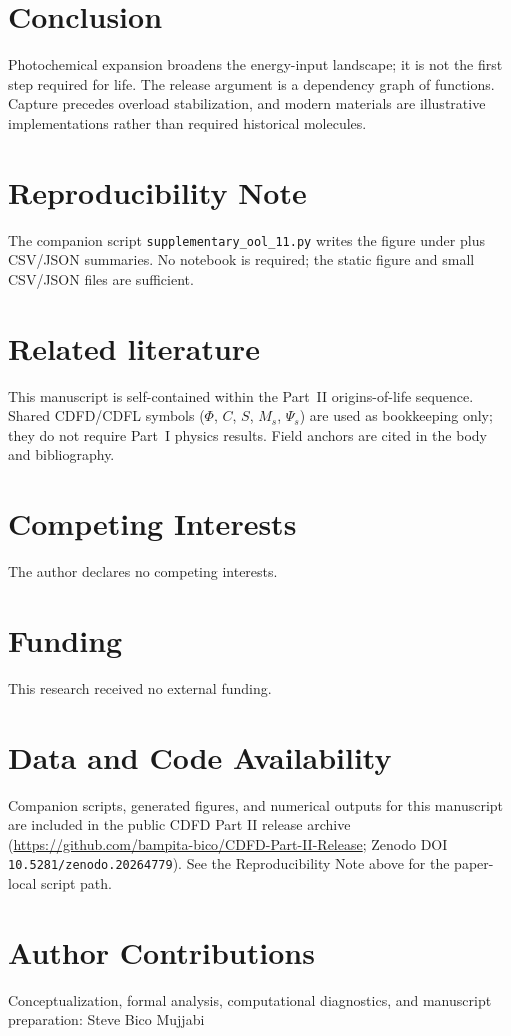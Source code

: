\documentclass[11pt,a4paper]{article}
\begin{document}
\section{Conclusion}
Photochemical expansion broadens the energy-input landscape; it is not the first step required for life. The release argument is a dependency graph of functions. Capture precedes overload stabilization, and modern materials are illustrative implementations rather than required historical molecules.

\section{Reproducibility Note}
The companion script \texttt{supplementary\_ool\_11.py} writes the figure
under  plus CSV/JSON summaries. No notebook is
required; the static figure and small CSV/JSON files are sufficient.

\section*{Related literature}
This manuscript is self-contained within the Part~II origins-of-life sequence. Shared CDFD/CDFL symbols ($\Phi$, $C$, $S$, $M_s$, $\Psi_s$) are used as bookkeeping only; they do not require Part~I physics results. Field anchors are cited in the body and bibliography.

\section*{Competing Interests}
The author declares no competing interests.

\section*{Funding}
This research received no external funding.

\section*{Data and Code Availability}
Companion scripts, generated figures, and numerical outputs for this manuscript are included in the public CDFD Part II release archive (\url{https://github.com/bampita-bico/CDFD-Part-II-Release}; Zenodo DOI \texttt{10.5281/zenodo.20264779}). See the Reproducibility Note above for the paper-local script path.

\section*{Author Contributions}
Conceptualization, formal analysis, computational diagnostics, and manuscript preparation: Steve Bico Mujjabi



\end{document}
